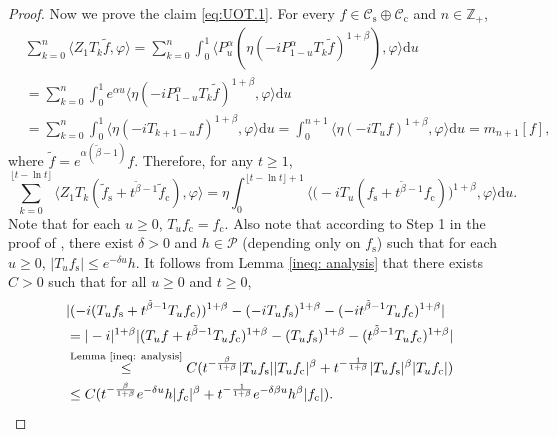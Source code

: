 \documentclass[12pt,a4paper]{amsart}
\theoremstyle{plain}
\theoremstyle{definition}
\numberwithin{equation}{section}
\begin{document}
\begin{proof}
Now we prove the claim \eqref{eq:UOT.1}.
For every $f\in \mathcal C_\mathrm s  \oplus \mathcal C_\mathrm c$ and $n\in \mathbb Z_+$,
 \begin{align}
  & \sum_{k=0}^n \langle Z_1 T_{k} \tilde f, \varphi \rangle
  = \sum_{k=0}^n \int_0^1 \langle P_u^\alpha (\eta(-iP_{1 - u}^\alpha T_k \tilde f)^{1+\beta}), \varphi\rangle \mathrm du
 \\& = \sum_{k=0}^n \int_0^1 e^{\alpha u} \langle \eta (-iP_{1 - u}^\alpha T_{k}\tilde f)^{1+\beta}, \varphi \rangle \mathrm du
 \\& = \sum_{k=0}^n \int_0^1 \langle \eta (-iT_{k+1 - u} f)^{1+\beta}, \varphi\rangle \mathrm du
 = \int_0^{n+1} \langle  \eta (-iT_{u} f)^{1+\beta}, \varphi\rangle \mathrm du = m_{n+1}[f],
 \end{align}
where $\tilde f=e^{\alpha(\tilde \beta - 1)} f$.
Therefore, for any $t\geq 1$,
\begin{equation} \label{eq:UOT.15}
\sum_{k=0}^{\lfloor t-\ln t \rfloor} \langle Z_1T_{k}(\tilde f_\mathrm s+t^{\tilde{\beta}-1}\tilde{f}_\mathrm c), \varphi\rangle
=\eta \int_0^{\lfloor t-\ln t \rfloor+1}\big\langle \big(-iT_u(f_\mathrm s+t^{\tilde{\beta}-1}f_\mathrm c)\big)^{1+\beta},\varphi \big\rangle \mathrm du.
\end{equation}
Note that for each $u\geq 0$, $T_uf_\mathrm c=f_\mathrm c$.
 Also note that according to
 Step 1 in the proof of \cite[Lemma 2.6]{RenSongSunZhao2019Stable}, there exist $\delta> 0$ and
$h\in \mathcal P$ (depending only on $f_\mathrm s$)
such that for each $u\geq 0$,
 $|T_u f_\mathrm s|\leq e^{-\delta u}h$.
It follows from Lemma \ref{ineq: analysis} that there exists $C>0$ such that for all $u\geq 0$ and $t\geq 0$,
\begin{align}
  &|(-i(T_uf_\mathrm s+t^{\tilde{\beta}-1}T_uf_\mathrm c))^{1+\beta}-(-iT_uf_\mathrm s)^{1+\beta}-(-it^{\tilde{\beta}-1}T_uf_\mathrm c)^{1+\beta}|
  \\&  = |-i|^{1+\beta} |(T_u f + t^{\tilde \beta -1} T_u f_\mathrm c)^{1+\beta} - (T_u f_\mathrm s)^{1+\beta} - (t^{\tilde \beta - 1}T_u f_\mathrm c)^{1+\beta}|
  \\&\overset{\text{Lemma \ref{ineq: analysis}}}
  \leq  C(t^{-\frac{\beta}{1+\beta}}|T_uf_\mathrm s||T_uf_\mathrm c|^{\beta}+t^{-\frac{1}{1+\beta}}|T_uf_\mathrm s|^{\beta}|T_uf_\mathrm c|)
  \\&\label{eq:UOT.21}\leq C(t^{-\frac{\beta}{1+\beta}}e^{-\delta u}h|f_\mathrm c|^{\beta}+t^{-\frac{1}{1+\beta}}e^{-\delta\beta u}h^{\beta}|f_\mathrm c|).

\end{align}
\end{proof}
\end{document}
